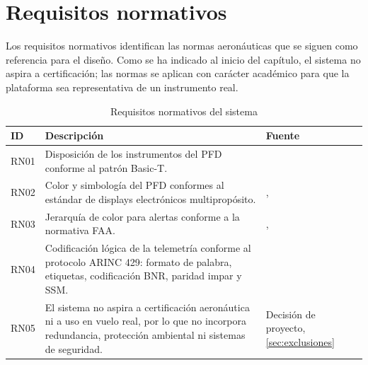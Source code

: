 \section{Requisitos normativos}
\label{sec:req_normativos}

Los requisitos normativos identifican las normas aeronáuticas que se siguen como
referencia para el diseño. Como se ha indicado al inicio del capítulo, el
sistema no aspira a certificación; las normas se aplican con carácter académico
para que la plataforma sea representativa de un instrumento real.

\begin{table}[H]
    \centering
    \caption{Requisitos normativos del sistema}
    \label{tab:req_normativos}
    \begin{tabularx}{\linewidth}{l X l}
        \toprule
        \textbf{ID} & \textbf{Descripción} & \textbf{Fuente} \\
        \midrule
        RN01 & Disposición de los instrumentos del PFD conforme al patrón Basic-T. & \cite{ac25_11b} \\
        RN02 & Color y simbología del PFD conformes al estándar de displays electrónicos multipropósito. & \cite{sae_as8034c}, \cite{hfstd001b} \\
        RN03 & Jerarquía de color para alertas conforme a la normativa FAA. & \cite{cfr25_1321}, \cite{cfr25_1322} \\
        RN04 & Codificación lógica de la telemetría conforme al protocolo ARINC 429: formato de palabra, etiquetas, codificación BNR, paridad impar y SSM. & \cite{arinc429} \\
        RN05 & El sistema no aspira a certificación aeronáutica ni a uso en vuelo real, por lo que no incorpora redundancia, protección ambiental ni sistemas de seguridad. & Decisión de proyecto, \cref{sec:exclusiones} \\
        \bottomrule
    \end{tabularx}
\end{table}


